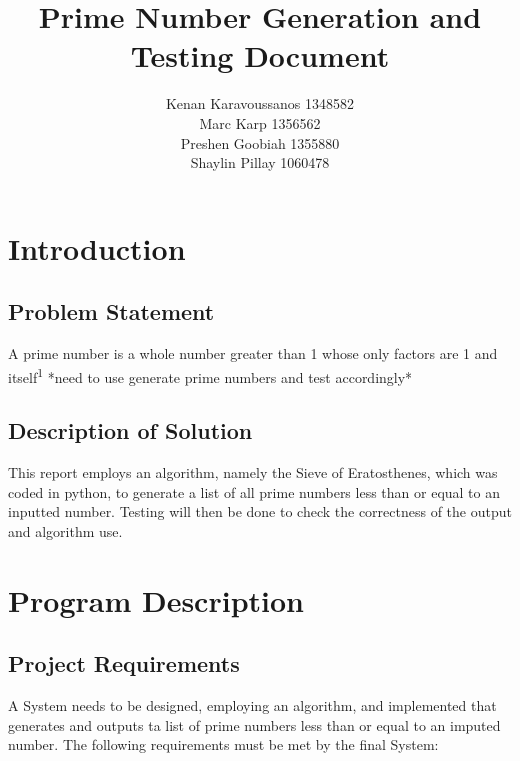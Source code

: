 \documentclass[]{article}
\title{Prime Number Generation and Testing Document}
\begin{document}
\author{
Kenan Karavoussanos 1348582 \\Marc Karp 1356562 \\Preshen Goobiah 1355880\\Shaylin Pillay 1060478}
    {}
\maketitle
\hfil \newpage
\tableofcontents
\hfil \newpage

\section{Introduction}


\subsection{Problem Statement}
A prime number is a whole number greater than 1 whose only factors are 1 and itself\textsuperscript{1}
*need to use generate prime numbers and test accordingly*

\subsection{Description of Solution}
This report employs an algorithm, namely the Sieve of Eratosthenes, which was coded in python, to generate a list of all prime numbers less than or equal to an inputted number. Testing will then be done to check the correctness of the output and algorithm use.


\section{Program Description}

\subsection{Project Requirements}
A System needs to be designed, employing an algorithm, and implemented that generates and outputs ta list of prime numbers less than or equal to an imputed number. The following requirements must be met by the final System:
\end{document}
